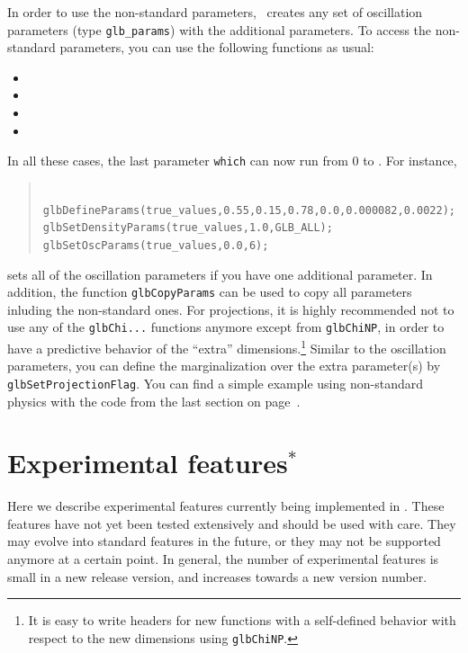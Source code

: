 In order to use the non-standard parameters, \GLOBES\ creates any set of oscillation parameters (type {\tt glb\_params})
with the additional parameters. To access the non-standard parameters, you can use the following functions as usual:
\begin{itemize}
\item
{}
\item
{}
\item
{}
\item
{}
\end{itemize}
In all these cases, the last parameter {\tt which} can now run from $0$ to . For instance,
\begin{quote}
{\tt
 glbDefineParams(true\_values,0.55,0.15,0.78,0.0,0.000082,0.0022); \\
 glbSetDensityParams(true\_values,1.0,GLB\_ALL); \\
 glbSetOscParams(true\_values,0.0,6);
}
\end{quote}
sets all of the oscillation parameters if you have one additional parameter. 
In addition, the function {\tt glbCopyParams}
can be used to copy all parameters inluding the non-standard ones. For projections,
it is highly recommended not to use any of the {\tt glbChi...} functions anymore except from {\tt glbChiNP},
 in order to have a
predictive behavior of the ``extra'' dimensions.\footnote{It is easy to write headers for new functions
with a self-defined behavior with respect to the new dimensions using {\tt glbChiNP}.} Similar to the oscillation parameters, you can define
the marginalization over the extra parameter(s) by {\tt glbSetProjectionFlag}. You can find a simple
example using non-standard physics with the code from the last section on page~\pageref{ex:nsphysics}.



\chapter{Experimental features$^*$}
\label{chapt:experimental}

Here we describe experimental features currently being implemented in \GLOBES . These features have not yet been tested extensively and should be used with care. They may evolve into standard features in the future, or they may not be supported anymore at a certain point. In general, the number of experimental features is small in a new release version, and increases towards a new version number.


